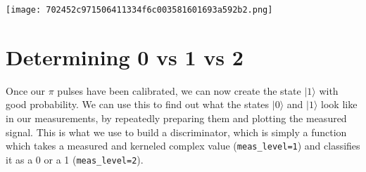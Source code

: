 \texttt{[image: 702452c971506411334f6c003581601693a592b2.png]}

\hypertarget{8519faaf-8459-4741-840a-c4a96a5ccc99}{}
\hypertarget{determining-0-vs-1-vs-2-}{%
\section{\texorpdfstring{Determining 0 vs 1 vs 2
}{Determining 0 vs 1 vs 2 }}\label{determining-0-vs-1-vs-2-}}

\leavevmode{}%
Once our \(\pi\) pulses have been calibrated, we can now create the
state \(\vert1\rangle\) with good probability. We can use this to find
out what the states \(\vert0\rangle\) and \(\vert1\rangle\) look like in
our measurements, by repeatedly preparing them and plotting the measured
signal. This is what we use to build a discriminator, which is simply a
function which takes a measured and kerneled complex value
(\texttt{meas\_level=1}) and classifies it as a 0 or a 1
(\texttt{meas\_level=2}).

